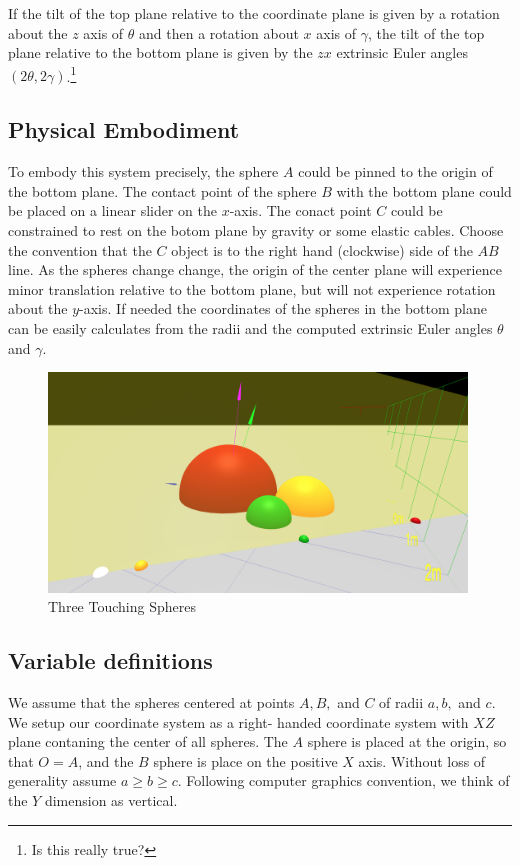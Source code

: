 \documentclass{article}
\begin{document}
If the tilt of the top plane relative to the coordinate plane is given by a rotation about the $z$ axis of $\theta$ and
then a rotation about $x$ axis of $\gamma$, the tilt of the top plane relative
to the bottom plane is given by the $zx$ extrinsic Euler angles $(2\theta, 2\gamma)$.\footnote{Is this really true?}

\subsection{Physical Embodiment}

To embody this system precisely, the sphere $A$ could be pinned to
the origin of the bottom plane.
The contact point of the sphere $B$ with the bottom plane
could be placed on a
linear slider on the $x$-axis.
The conact point $C$ could be constrained to
rest on the botom plane by gravity or some elastic cables.
Choose the convention that the $C$ object is to the right hand
(clockwise)
side of the $AB$ line.
As the spheres
change change, the origin of the center plane will experience minor translation
relative to the bottom plane, but will not experience rotation about the $y$-axis.
If needed the coordinates of the spheres in the bottom plane can be easily
calculates from the radii and the computed extrinsic Euler angles $\theta$ and $\gamma$.

\begin{figure}
     \centering
     \includegraphics[width=0.99\textwidth]{figures/StandardThreeSphereDiagram.png}
     \caption{Three Touching Spheres}
  \label{fig:fixed}
\end{figure}

\subsection{Variable definitions}

We assume that the spheres centered at points $A,B,$ and $C$
of radii $a,b,$ and $c$. We setup our coordinate system as a right-
handed coordinate system with $XZ$ plane contaning the center of all spheres.
The $A$ sphere is placed at the origin, so that $O = A$, and the $B$ sphere
is place on the positive $X$ axis. Without loss of generality assume $a \geq b \geq c$.
Following computer graphics convention, we think of the $Y$ dimension as vertical.
\end{document}
